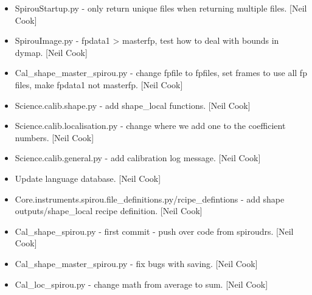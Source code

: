 \documentclass[a4paper,10pt,english]{report}
\begin{document}
\begin{itemize}
\item {} 
SpirouStartup.py - only return unique files when returning multiple
files. {[}Neil Cook{]}

\item {} 
SpirouImage.py - fpdata1 \textendash{}\textgreater{} masterfp, test how to deal with bounds in
dymap. {[}Neil Cook{]}

\item {} 
Cal\_shape\_master\_spirou.py - change fpfile to fpfiles, set frames to
use all fp files, make fpdata1 not masterfp. {[}Neil Cook{]}

\item {} 
Science.calib.shape.py - add shape\_local functions. {[}Neil Cook{]}

\item {} 
Science.calib.localisation.py - change where we add one to the
coefficient numbers. {[}Neil Cook{]}

\item {} 
Science.calib.general.py - add calibration log message. {[}Neil Cook{]}

\item {} 
Update language database. {[}Neil Cook{]}

\item {} 
Core.instruments.spirou.file\_definitions.py/rcipe\_defintions - add
shape outputs/shape\_local recipe definition. {[}Neil Cook{]}

\item {} 
Cal\_shape\_spirou.py - first commit - push over code from spiroudrs.
{[}Neil Cook{]}

\item {} 
Cal\_shape\_master\_spirou.py - fix bugs with saving. {[}Neil Cook{]}

\item {} 
Cal\_loc\_spirou.py - change math from average to sum. {[}Neil Cook{]}

\end{itemize}
\end{document}
